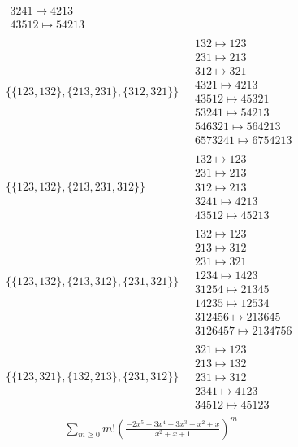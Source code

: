 \begin{scriptsize}
\begin{align}
\begin{matrix}
\\
3241 \mapsto 4213
\\
43512 \mapsto 54213
\end{matrix}
\\
\{\{123, 132\}, \{213, 231\}, \{312, 321\}\}
\ 
&
\begin{matrix}
132 \mapsto 123
\\
231 \mapsto 213
\\
312 \mapsto 321
\\
4321 \mapsto 4213
\\
43512 \mapsto 45321
\\
53241 \mapsto 54213
\\
546321 \mapsto 564213
\\
6573241 \mapsto 6754213
\end{matrix}
\\
\{\{123, 132\}, \{213, 231, 312\}\}
\ 
&
\begin{matrix}
132 \mapsto 123
\\
231 \mapsto 213
\\
312 \mapsto 213
\\
3241 \mapsto 4213
\\
43512 \mapsto 45213
\end{matrix}
\\
\{\{123, 132\}, \{213, 312\}, \{231, 321\}\}
\ 
&
\begin{matrix}
132 \mapsto 123
\\
213 \mapsto 312
\\
231 \mapsto 321
\\
1234 \mapsto 1423
\\
31254 \mapsto 21345
\\
14235 \mapsto 12534
\\
312456 \mapsto 213645
\\
3126457 \mapsto 2134756
\end{matrix}
\\
\{\{123, 321\}, \{132, 213\}, \{231, 312\}\}
\ 
&
\begin{matrix}
321 \mapsto 123
\\
213 \mapsto 132
\\
231 \mapsto 312
\\
2341 \mapsto 4123
\\
34512 \mapsto 45123
\end{matrix}
\end{align}
$$
\begin{matrix}
\sum_{m \geq 0} m! \left(
\frac{-2 x^{5} - 3 x^{4} - 3 x^{3} + x^{2} + x}{x^{2} + x + 1}
\right)^m

\end{matrix}$$
\end{scriptsize}
